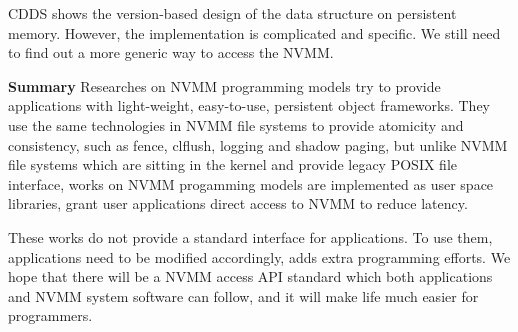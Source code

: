 CDDS shows the version-based design of the data structure on persistent
memory. However, the implementation is complicated and specific. We still
need to find out a more generic way to access the NVMM.


\textbf{Summary} Researches on NVMM programming models try to provide
applications with light-weight, easy-to-use, persistent object frameworks.
 They use the same technologies in NVMM file systems to provide atomicity and
consistency, such as fence, clflush, logging and shadow paging,
but unlike NVMM file systems which are sitting in the kernel and provide
legacy POSIX file interface, works on NVMM progamming models are implemented
as user space libraries, grant user applications direct access to NVMM
to reduce latency.

These works do not provide a standard interface for applications. To use
them, applications need to be modified accordingly, adds extra programming
efforts. We hope that there will be a NVMM access API standard which both
applications and NVMM system software can follow, and it will make life 
much easier for programmers.

